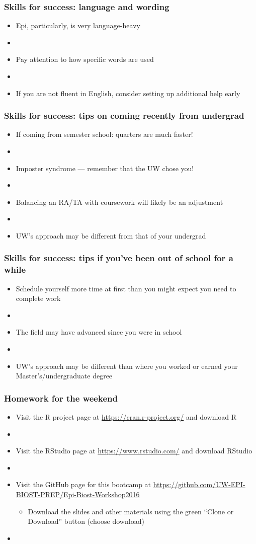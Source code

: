 \documentclass[12pt]{beamer}
\newcommand{\myframe}[1]{\begin{frame} \frametitle{#1}}
\begin{document}
\myframe{Skills for success: language and wording}
\begin{itemize}
\item Epi, particularly, is very language-heavy
\item[]
\item Pay attention to how specific words are used
\item[]
\item If you are not fluent in English, consider setting up additional help early
\end{itemize}
\end{frame}

\myframe{Skills for success: tips on coming recently from undergrad}
\begin{itemize}
\item If coming from semester school: quarters are much faster!
\item[]
\item Imposter syndrome --- remember that the UW chose you!
\item[]
\item Balancing an RA/TA with coursework will likely be an adjustment
\item[]
\item UW's approach may be different from that of your undergrad
\end{itemize}
\end{frame}

\myframe{Skills for success: tips if you've been out of school for a while}
\begin{itemize}
\item Schedule yourself more time at first than you might expect you need to complete work
\item[]
\item The field may have advanced since you were in school
\item[]
\item UW's approach may be different than where you worked or earned your Master's/undergraduate degree
\end{itemize}
\end{frame}

\myframe{Homework for the weekend}
\begin{itemize}
\item Visit the R project page at \url{https://cran.r-project.org/} and download R
\item[]
\item Visit the RStudio page at \url{https://www.rstudio.com/} and download RStudio
\item[]
\item Visit the GitHub page for this bootcamp at \url{https://github.com/UW-EPI-BIOST-PREP/Epi-Biost-Workshop2016}
\begin{itemize}
\item Download the slides and other materials using the green ``Clone or Download'' button (choose download)
\end{itemize}
\item[]
\end{itemize}
\end{frame}
\end{document}
